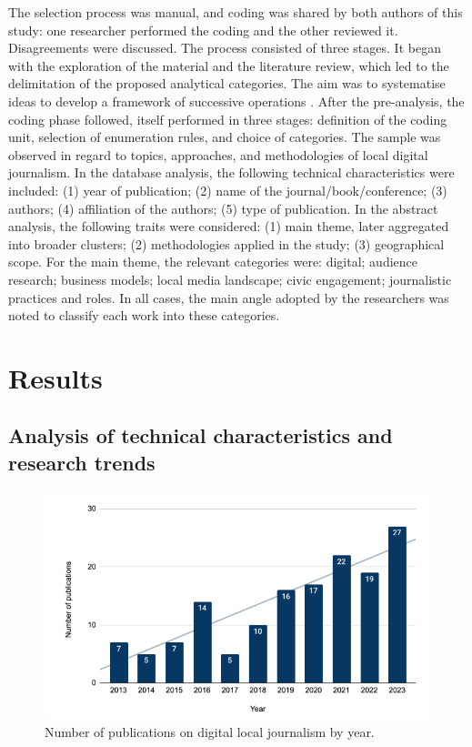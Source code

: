 \documentclass[english]{textolivre}
\begin{document}
The selection process was manual, and coding was shared by both authors of this study: one researcher performed the coding and the other reviewed it. Disagreements were discussed. The process consisted of three stages. It began with the exploration of the material and the literature review, which led to the delimitation of the proposed analytical categories. The aim was to systematise ideas to develop a framework of successive operations \cite{bardin1977}. After the pre-analysis, the coding phase followed, itself performed in three stages: definition of the coding unit, selection of enumeration rules, and choice of categories. The sample was observed in regard to topics, approaches, and methodologies of local digital journalism. In the database analysis, the following technical characteristics were included: (1) year of publication; (2) name of the journal/book/conference; (3) authors; (4) affiliation of the authors; (5) type of publication. In the abstract analysis, the following traits were considered: (1) main theme, later aggregated into broader clusters; (2) methodologies applied in the study; (3) geographical scope. For the main theme, the relevant categories were: digital; audience research; business models; local media landscape; civic engagement; journalistic practices and roles. In all cases, the main angle adopted by the researchers was noted to classify each work into these categories.

\section{Results}

\subsection{Analysis of technical characteristics and research trends}

\begin{figure}[htbp]
\centering
\begin{minipage}{0.75\textwidth}
\includegraphics[width =\textwidth]{Imagens/Fig1.png}
\caption{Number of publications on digital local journalism by year.}
\label{fig-1}
\end{minipage}
\end{figure}
\end{document}
